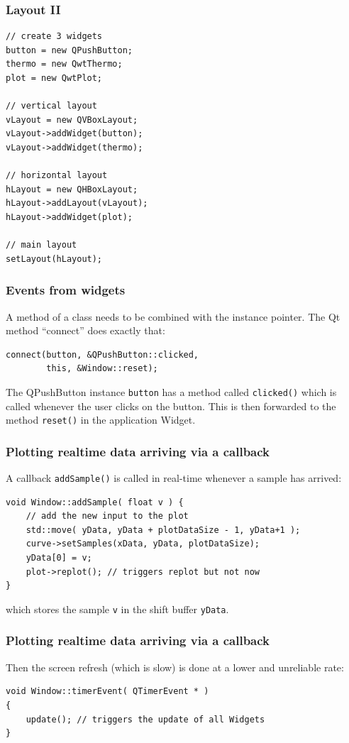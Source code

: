 \documentclass[xcolor=dvipsnames]{beamer}
\begin{document}
\begin{frame}[fragile]
  \frametitle{Layout II}

\begin{verbatim}
// create 3 widgets
button = new QPushButton;
thermo = new QwtThermo; 
plot = new QwtPlot;

// vertical layout
vLayout = new QVBoxLayout;
vLayout->addWidget(button);
vLayout->addWidget(thermo);

// horizontal layout
hLayout = new QHBoxLayout;
hLayout->addLayout(vLayout);
hLayout->addWidget(plot);

// main layout
setLayout(hLayout);
\end{verbatim}
\end{frame}



\begin{frame}[fragile]
\frametitle{Events from widgets}
A method of a class needs to be combined with the instance
pointer. The Qt method ``connect'' does exactly that:
\begin{verbatim}
connect(button, &QPushButton::clicked,
        this, &Window::reset);
\end{verbatim}
The QPushButton instance \texttt{button}
has a method called \texttt{clicked()} which is
called whenever the user clicks on the button.
This is then forwarded to the
method \texttt{reset()} in the application Widget.
\end{frame}


\begin{frame}[fragile]
\frametitle{Plotting realtime data arriving via a callback}
A callback \texttt{addSample()} is called in real-time whenever
a sample has arrived:
\begin{verbatim}
void Window::addSample( float v ) {
    // add the new input to the plot
    std::move( yData, yData + plotDataSize - 1, yData+1 );
    curve->setSamples(xData, yData, plotDataSize);
    yData[0] = v;
    plot->replot(); // triggers replot but not now
}
\end{verbatim}
which stores the sample \texttt{v} in the shift buffer \texttt{yData}.
\end{frame}


\begin{frame}[fragile]
\frametitle{Plotting realtime data arriving via a callback}
Then the screen refresh (which is slow) is done at
a lower and unreliable rate:
\begin{verbatim}
void Window::timerEvent( QTimerEvent * )
{
    update(); // triggers the update of all Widgets
}
\end{verbatim}
\end{frame}
\end{document}
